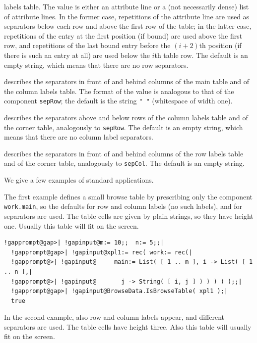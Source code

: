 \documentclass[a4paper,11pt]{report}
\begin{document}
{{{\begin{description}
labels table. The value is either an attribute line or a (not necessarily
dense) list of attribute lines. In the former case, repetitions of the
attribute line are used as separators below each row and above the first row
of the table; in the latter case, repetitions of the entry at the first
position (if bound) are used above the first row, and repetitions of the last
bound entry before the $(i+2)$\texttt{}th position (if there is such an entry at all) are used
below the $i$\texttt{}th table row. The default is an empty string, which means
that there are no row separators. 
\item[{\texttt{sepCol}}]  describes the separators in front of and behind columns of the main table and
of the column labels table. The format of the value is analogous to that of
the component \texttt{sepRow}; the default is the string \texttt{" "} (whitespace of width one). 
\item[{\texttt{sepLabelsCol}}]  describes the separators above and below rows of the column labels table and
of the corner table, analogously to \texttt{sepRow}. The default is an empty string, which means that there are no column label
separators. 
\item[{\texttt{sepLabelsRow}}]  describes the separators in front of and behind columns of the row labels
table and of the corner table, analogously to \texttt{sepCol}. The default is an empty string. 
\end{description}
 We give a few examples of standard applications. 

 The first example defines a small browse table by prescribing only the
component \texttt{work.main}, so the defaults for row and column labels (no such labels), and for
separators are used. The table cells are given by plain strings, so they have
height one. Usually this table will fit on the screen. 

 
\begin{Verbatim}[commandchars=!@|,fontsize=\small,frame=single,label=Example]
  !gapprompt@gap>| !gapinput@m:= 10;;  n:= 5;;|
  !gapprompt@gap>| !gapinput@xpl1:= rec( work:= rec(|
  !gapprompt@>| !gapinput@     main:= List( [ 1 .. m ], i -> List( [ 1 .. n ],|
  !gapprompt@>| !gapinput@       j -> String( [ i, j ] ) ) ) ) );;|
  !gapprompt@gap>| !gapinput@BrowseData.IsBrowseTable( xpl1 );|
  true
\end{Verbatim}
 

 In the second example, also row and column labels appear, and different
separators are used. The table cells have height three. Also this table will
usually fit on the screen. 

}}}
\end{document}
